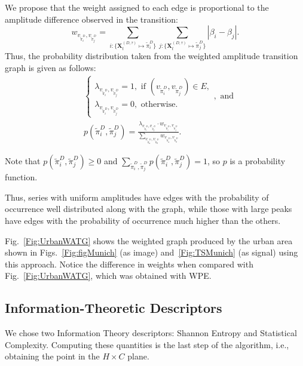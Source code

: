 \documentclass[journal]{IEEEtran}
\begin{document}
	We propose that the weight assigned to each edge is proportional to the amplitude difference observed in the transition:	
	\begin{equation}
	w_{v_{\widetilde \pi^D_i}, v_{\widetilde \pi^D_j}} =  \sum_{i : \{\mathbf{X}^{(D,\tau)}_t \mapsto \widetilde\pi^D_i\}} \sum_{j : \{\mathbf{X}^{(D,\tau)}_t \mapsto \widetilde\pi^D_j\}} |\beta_i - \beta_j| .
	\end{equation}
	Thus, the probability distribution taken from the weighted amplitude transition graph is given as follows:	
	\begin{align}
	&\left\{\begin{array}{l}
	\lambda_{v_{\widetilde\pi^D_i}, v_{\widetilde\pi^D_j}} = 1, \text{ if } (v_{\widetilde\pi^D_i}, v_{\widetilde\pi^D_j}) \in {E}, \\
	\lambda_{v_{\widetilde\pi^D_i}, v_{\widetilde\pi^D_j}} = 0, \text{ otherwise}.
	\end{array}\right., \text{ and} \\
	&p(\widetilde\pi^D_i, \widetilde\pi^D_j) = \frac{\lambda_{v_{\widetilde\pi^D_i}, v_{\widetilde\pi^D_j}} \cdot w_{v_{\widetilde\pi^D_i}, v_{\widetilde\pi^D_j}}}{\sum_{v_{\widetilde\pi^D_a}, v_{\widetilde\pi^D_b}} w_{v_{\widetilde\pi^D_a}, v_{\widetilde\pi^D_b}}}.
	\end{align}
	
	Note that  $p(\widetilde\pi^D_i, \widetilde\pi^D_j) \ge 0$ and $\sum_{\widetilde\pi^D_i, \widetilde\pi^D_j} p(\widetilde\pi^D_i, \widetilde\pi^D_j) = 1$, so $p$ is a probability function.
	
	Thus, series with uniform amplitudes have edges with the probability of occurrence well distributed along with the graph, while those with large peaks have edges with the probability of occurrence much higher than the others.
	
	Fig.~\ref{Fig:UrbanWATG} shows the weighted graph produced by the urban  area shown in Figs.~\ref{Fig:figMunich} (as image) and~\ref{Fig:TSMunich} (as signal) using this approach.
	Notice the difference in weights when compared with Fig.~\ref{Fig:UrbanWATG}, which was obtained with WPE.
	
	
	\subsection{Information-Theoretic Descriptors}\label{HC}
	
	We chose two Information Theory descriptors: Shannon Entropy and Statistical Complexity.
	Computing these quantities is the last step of the algorithm, i.e., obtaining the point in the $H \times C$ plane.
	
\end{document}

